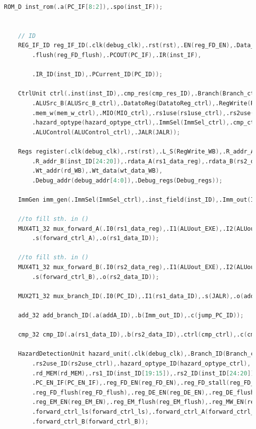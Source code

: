 \begin{lstlisting}[language = {verilog}]
    ROM_D inst_rom(.a(PC_IF[8:2]),.spo(inst_IF));


    // ID
    REG_IF_ID reg_IF_ID(.clk(debug_clk),.rst(rst),.EN(reg_FD_EN),.Data_stall(reg_FD_stall),
        .flush(reg_FD_flush),.PCOUT(PC_IF),.IR(inst_IF),

        .IR_ID(inst_ID),.PCurrent_ID(PC_ID));
    
    CtrlUnit ctrl(.inst(inst_ID),.cmp_res(cmp_res_ID),.Branch(Branch_ctrl),.ALUSrc_A(ALUSrc_A_ctrl),
        .ALUSrc_B(ALUSrc_B_ctrl),.DatatoReg(DatatoReg_ctrl),.RegWrite(RegWrite_ctrl),
        .mem_w(mem_w_ctrl),.MIO(MIO_ctrl),.rs1use(rs1use_ctrl),.rs2use(rs2use_ctrl),
        .hazard_optype(hazard_optype_ctrl),.ImmSel(ImmSel_ctrl),.cmp_ctrl(cmp_ctrl),
        .ALUControl(ALUControl_ctrl),.JALR(JALR));
    
    Regs register(.clk(debug_clk),.rst(rst),.L_S(RegWrite_WB),.R_addr_A(inst_ID[19:15]),
        .R_addr_B(inst_ID[24:20]),.rdata_A(rs1_data_reg),.rdata_B(rs2_data_reg),
        .Wt_addr(rd_WB),.Wt_data(wt_data_WB),
        .Debug_addr(debug_addr[4:0]),.Debug_regs(Debug_regs));
    
    ImmGen imm_gen(.ImmSel(ImmSel_ctrl),.inst_field(inst_ID),.Imm_out(Imm_out_ID));
    
    //to fill sth. in ()
    MUX4T1_32 mux_forward_A(.I0(rs1_data_reg),.I1(ALUout_EXE),.I2(ALUout_MEM),.I3(Datain_MEM),        
        .s(forward_ctrl_A),.o(rs1_data_ID));
    
    //to fill sth. in ()
    MUX4T1_32 mux_forward_B(.I0(rs2_data_reg),.I1(ALUout_EXE),.I2(ALUout_MEM),.I3(Datain_MEM),        
        .s(forward_ctrl_B),.o(rs2_data_ID));
    
    MUX2T1_32 mux_branch_ID(.I0(PC_ID),.I1(rs1_data_ID),.s(JALR),.o(addA_ID));

    add_32 add_branch_ID(.a(addA_ID),.b(Imm_out_ID),.c(jump_PC_ID));

    cmp_32 cmp_ID(.a(rs1_data_ID),.b(rs2_data_ID),.ctrl(cmp_ctrl),.c(cmp_res_ID));        
    
    HazardDetectionUnit hazard_unit(.clk(debug_clk),.Branch_ID(Branch_ctrl),.rs1use_ID(rs1use_ctrl),
        .rs2use_ID(rs2use_ctrl),.hazard_optype_ID(hazard_optype_ctrl),.rd_EXE(rd_EXE),
        .rd_MEM(rd_MEM),.rs1_ID(inst_ID[19:15]),.rs2_ID(inst_ID[24:20]),.rs2_EXE(rs2_EXE),
        .PC_EN_IF(PC_EN_IF),.reg_FD_EN(reg_FD_EN),.reg_FD_stall(reg_FD_stall),
        .reg_FD_flush(reg_FD_flush),.reg_DE_EN(reg_DE_EN),.reg_DE_flush(reg_DE_flush),
        .reg_EM_EN(reg_EM_EN),.reg_EM_flush(reg_EM_flush),.reg_MW_EN(reg_MW_EN),
        .forward_ctrl_ls(forward_ctrl_ls),.forward_ctrl_A(forward_ctrl_A),
        .forward_ctrl_B(forward_ctrl_B));


\end{lstlisting}
